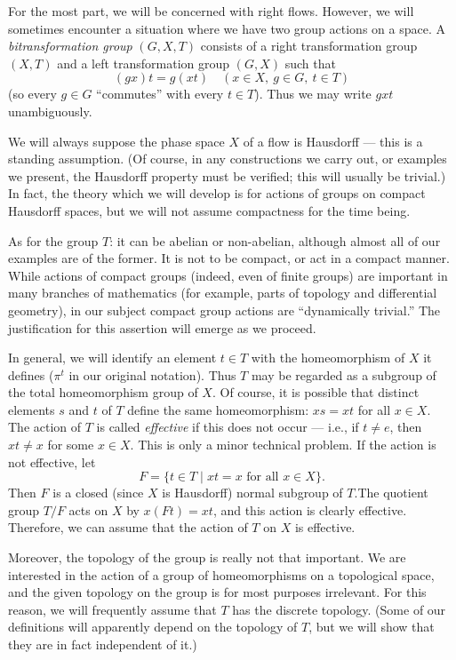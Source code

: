 For the most part, we will be concerned with right flows. However, we will sometimes encounter a situation where we have two group actions on a space. A \emph{bitransformation group} $(G, X, T)$ consists of a right transformation group $(X, T)$ and a left transformation group $(G, X)$ such that
\[
    (gx)t = g(xt) \quad (x \in X,\ g \in G,\ t \in T)
\]
(so every $g \in G$ ``commutes'' with every $t \in T$). Thus we may write $gxt$ unambiguously.

We will always suppose the phase space $X$ of a flow is Hausdorff — this is a standing assumption. (Of course, in any constructions we carry out, or examples we present, the Hausdorff property must be verified; this will usually be trivial.) In fact, the theory which we will develop is for actions of groups on compact Hausdorff spaces, but we will not assume compactness for the time being.

As for the group $T$: it can be abelian or non-abelian, although almost all of our examples are of the former. It is not to be compact, or act in a compact manner. While actions of compact groups (indeed, even of finite groups) are important in many branches of mathematics (for example, parts of topology and differential geometry), in our subject compact group actions are ``dynamically trivial.'' The justification for this assertion will emerge as we proceed.

In general, we will identify an element $t \in T$ with the homeomorphism of $X$ it defines ($\pi^{t}$ in our original notation). Thus $T$ may be regarded as a subgroup of the total homeomorphism group of $X$. Of course, it is possible that distinct elements $s$ and $t$ of $T$ define the same homeomorphism: $xs = xt$ for all $x \in X$. The action of $T$ is called \emph{effective} if this does not occur — i.e., if $t \neq e$, then $xt \neq x$ for some $x \in X$. This is only a minor technical problem. If the action is not effective, let
\[
    F = \{t \in T \mid xt = x \text{ for all } x \in X\}.
\]
Then $F$ is a closed (since $X$ is Hausdorff) normal subgroup of $T$.The quotient group $T/F$ acts on $X$ by $x(Ft) = xt$, and this action is clearly effective. Therefore, we can assume that the action of $T$ on $X$ is effective.


Moreover, the topology of the group is really not that important. We are interested in the action of a group of homeomorphisms on a topological space, and the given topology on the group is for most purposes irrelevant. For this reason, we will frequently assume that $T$ has the discrete topology. (Some of our definitions will apparently depend on the topology of $T$, but we will show that they are in fact independent of it.)

